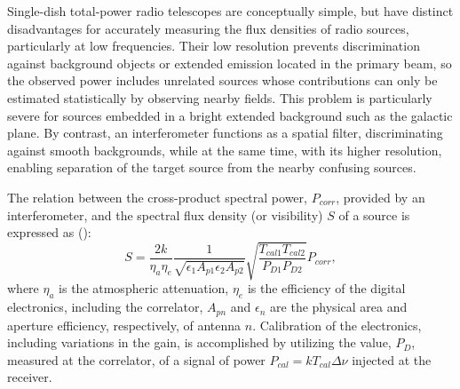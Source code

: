 \documentclass{aastex}
\begin{document}
Single-dish total-power radio telescopes are conceptually simple, but
have distinct disadvantages for accurately measuring the flux
densities of radio sources, particularly at low frequencies.  Their
low resolution prevents discrimination against background objects or
extended emission located in the primary beam, so the observed power
includes unrelated sources whose contributions can only be estimated
statistically by observing nearby fields.  This problem is
particularly severe for sources embedded in a bright extended
background such as the galactic plane.  By contrast, an interferometer
functions as a spatial filter, discriminating against smooth
backgrounds, while at the same time, with its higher resolution,
enabling separation of the target source from the nearby confusing
sources.

The relation between the cross-product spectral power, $P_{corr}$,
provided by an interferometer, and the spectral flux density (or
visibility) $S$ of a source is expressed as (\citet{Per10}):
\begin{equation}
S = \frac{2k}{\eta_a\eta_e}\frac{1}{\sqrt{\epsilon_1A_{p1}\epsilon_2A_{p2}}}
\sqrt{\frac{T_{cal1}T_{cal2}}{P_{D1}P_{D2}}}P_{corr},
\end{equation}
where $\eta_a$ is the atmospheric attenuation, $\eta_e$ is the
efficiency of the digital electronics, including the correlator,
$A_{pn}$ and $\epsilon_n$ are the physical area and aperture
efficiency, respectively, of antenna $n$.  Calibration of the
electronics, including variations in the gain, is accomplished by
utilizing the value, $P_D$, measured at the correlator, of a signal
of power $P_{cal}=kT_{cal}\Delta\nu$ injected at the receiver.
\end{document}
